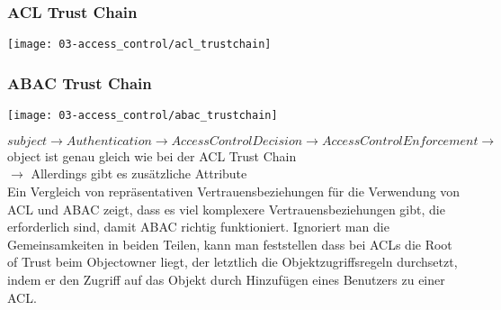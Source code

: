 \subsubsection{ACL Trust Chain}
\begin{center}
    \texttt{[image: 03-access\_control/acl\_trustchain]}
    \vspace{-8pt}
\end{center}

\subsubsection{ABAC Trust Chain}
\begin{center}
    \texttt{[image: 03-access\_control/abac\_trustchain]}
    \vspace{-8pt}
\end{center}

$subject \rightarrow Authentication \rightarrow Access Control Decision \rightarrow Access Control Enforcement \rightarrow$ object ist genau gleich wie bei der ACL Trust Chain\\
$\rightarrow$ Allerdings gibt es zusätzliche Attribute\\

Ein Vergleich von repräsentativen Vertrauensbeziehungen für die Verwendung von ACL und ABAC zeigt, dass es viel komplexere Vertrauensbeziehungen gibt, die erforderlich sind, damit ABAC richtig funktioniert. Ignoriert man die Gemeinsamkeiten in beiden Teilen, kann man feststellen dass bei ACLs die Root of Trust beim Objectowner liegt, der letztlich die Objektzugriffsregeln durchsetzt, indem er den Zugriff auf das Objekt durch Hinzufügen eines Benutzers zu einer ACL. 

